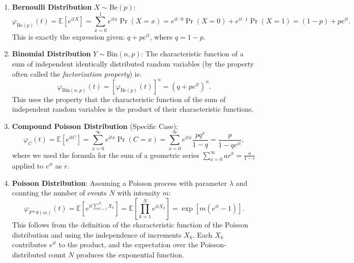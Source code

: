 \begin{enumerate}[label=(\alph*)]
    \item 
    \textbf{Bernoulli Distribution} \(X \sim \text{Be}(p)\):
    \[
    \varphi_{\text{Be}(p)}(t) = \mathbb{E}[e^{itX}] = \sum_{x=0}^1 e^{itx} \Pr(X = x) = e^{it \cdot 0} \Pr(X=0) + e^{it \cdot 1} \Pr(X=1) = (1-p) + pe^{it}.
    \]
    This is exactly the expression given: \(q + p e^{it}\), where \(q = 1-p\).
    
    \item 
    \textbf{Binomial Distribution} \(Y \sim \text{Bin}(n,p)\):
    The characteristic function of a sum of independent identically distributed random variables (by the property often called the \emph{factorization property}) is:
    \[
    \varphi_{\text{Bin}(n,p)}(t) = [\varphi_{\text{Be}(p)}(t)]^n = (q + pe^{it})^n.
    \]
    This uses the property that the characteristic function of the sum of independent random variables is the product of their characteristic functions.
    
    \item 
    \textbf{Compound Poisson Distribution} (Specific Case):
    \[
    \varphi_{C}(t) = \mathbb{E}[e^{itC}] = \sum_{x=0}^\infty e^{itx} \Pr(C = x) = \sum_{x=0}^\infty e^{itx} \frac{p q^x}{1-q} = \frac{p}{1-qe^{it}},
    \]
    where we used the formula for the sum of a geometric series \(\sum_{x=0}^\infty ar^x = \frac{a}{1-r}\) applied to \(e^{it}\) as \(r\).
    
    \item 
    \textbf{Poisson Distribution}:
    Assuming a Poisson process with parameter \(\lambda\) and counting the number of events \(N\) with intensity \(m\):
    \[
    \varphi_{P \ast \theta(m)}(t) = \mathbb{E}\left[e^{it \sum_{k=1}^N X_k}\right] = \mathbb{E}\left[\prod_{k=1}^N e^{itX_k}\right] = \exp\left[m(e^{it} - 1)\right].
    \]
    This follows from the definition of the characteristic function of the Poisson distribution and using the independence of increments \(X_k\). Each \(X_k\) contributes \(e^{it}\) to the product, and the expectation over the Poisson-distributed count \(N\) produces the exponential function.
    
\end{enumerate}
